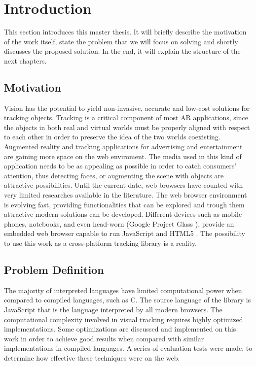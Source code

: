 \chapter{Introduction} %
\label{cha:introduction}

This section introduces this master thesis. It will briefly describe the motivation of the work itself, state the problem that we will focus on solving and shortly discusses the proposed solution. In the end, it will explain the structure of the next chapters.

\section{Motivation} %
\label{sec:introduction:motivation}

Vision has the potential to yield non-invasive, accurate and low-cost solutions for tracking objects. Tracking is a critical component of most AR applications, since the objects in both real and virtual worlds must be properly aligned with respect to each other in order to preserve the idea of the two worlds coexisting. Augmented reality and tracking applications for advertising and entertainment are gaining more space on the web enviroment. The media used in this kind of application needs to be as appealing as possible in order to catch consumers' attention, thus detecting faces, or augmenting the scene with objects are attractive possibilities. Until the current date, web browsers have counted with very limited researches available in the literature. The web browser environment is evolving fast, providing functionalities that can be explored and trough them attractive modern solutions can be developed. Different devices such as mobile phones, notebooks, and even head-worn \cite{Benford1998} (Google Project Glass \cite{Glass2013}), provide an embedded web browser capable to run JavaScript and HTML5 \cite{International2009,Hickson2013}. The possibility to use this work as a cross-platform tracking library is a reality.


\section{Problem Definition} %
\label{sec:introduction:problem_definition}

The majority of interpreted languages have limited computational power when compared to compiled languages, such as C. The source language of the library is JavaScript \cite{International2009} that is the language interpreted by all modern browsers. The computational complexity involved in visual tracking requires highly optimized implementations. Some optimizations are discussed and implemented on this work in order to achieve good results when compared with similar implementations in compiled languages. A series of evaluation tests were made, to determine how effective these techniques were on the web.

